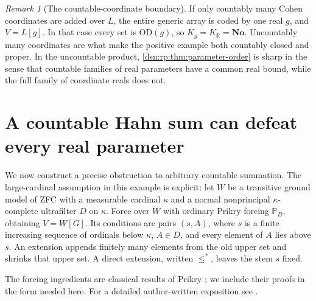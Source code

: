 \documentclass[11pt,a4paper]{article}
\numberwithin{equation}{section}
\theoremstyle{definition}
\theoremstyle{remark}
\newtheorem{remark}[remark]{Remark}
\newcommand{\No}{\mathbf{No}}
\newcommand{\OD}{\mathrm{OD}}
\newcommand{\R}{\mathbb R}
\newcommand{\KR}{K_{\R}}
\begin{document}
\begin{remark}[The countable-coordinate boundary]
If only countably many Cohen coordinates are added over $L$, the entire
generic array is coded by one real $g$, and $V=L[g]$. In that case every
set is $\OD(g)$, so $K_g=\KR=\No$. Uncountably many coordinates are
what make the positive example both countably closed and proper.
In the uncountable product, \cref{dsn:rp:thm:parameter-order} is sharp in the sense
that countable families of real parameters have a common real bound,
while the full family of coordinate reals does not.
\end{remark}

\section{A countable Hahn sum can defeat every real parameter}
\label{dsn:rp:sec:prikry}

We now construct a precise obstruction to arbitrary countable summation.
The large-cardinal assumption in this example is explicit: let $W$ be
a transitive ground model of ZFC with a measurable cardinal $\kappa$
and a normal nonprincipal $\kappa$-complete ultrafilter $D$ on $\kappa$.
Force over $W$ with ordinary Prikry forcing $\mathbb P_D$, obtaining
$V=W[G]$.  Its conditions are pairs $(s,A)$, where $s$ is a finite
increasing sequence of ordinals below $\kappa$, $A\in D$, and every
element of $A$ lies above $s$.  An extension appends finitely many
elements from the old upper set and shrinks that upper set.  A direct
extension, written $\leq^*$, leaves the stem $s$ fixed.

The forcing ingredients are classical results of Prikry
\cite{Prikry}; we include their proofs in the form needed here.
For a detailed author-written exposition see
\cite[Section~9.2]{KaragilaForcing}.
\end{document}
